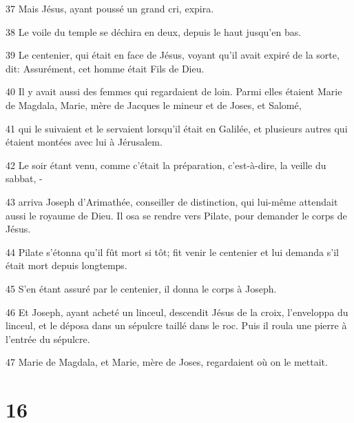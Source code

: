 \par 37 Mais Jésus, ayant poussé un grand cri, expira.
\par 38 Le voile du temple se déchira en deux, depuis le haut jusqu'en bas.
\par 39 Le centenier, qui était en face de Jésus, voyant qu'il avait expiré de la sorte, dit: Assurément, cet homme était Fils de Dieu.
\par 40 Il y avait aussi des femmes qui regardaient de loin. Parmi elles étaient Marie de Magdala, Marie, mère de Jacques le mineur et de Joses, et Salomé,
\par 41 qui le suivaient et le servaient lorsqu'il était en Galilée, et plusieurs autres qui étaient montées avec lui à Jérusalem.
\par 42 Le soir étant venu, comme c'était la préparation, c'est-à-dire, la veille du sabbat, -
\par 43 arriva Joseph d'Arimathée, conseiller de distinction, qui lui-même attendait aussi le royaume de Dieu. Il osa se rendre vers Pilate, pour demander le corps de Jésus.
\par 44 Pilate s'étonna qu'il fût mort si tôt; fit venir le centenier et lui demanda s'il était mort depuis longtemps.
\par 45 S'en étant assuré par le centenier, il donna le corps à Joseph.
\par 46 Et Joseph, ayant acheté un linceul, descendit Jésus de la croix, l'enveloppa du linceul, et le déposa dans un sépulcre taillé dans le roc. Puis il roula une pierre à l'entrée du sépulcre.
\par 47 Marie de Magdala, et Marie, mère de Joses, regardaient où on le mettait.

\chapter{16}

